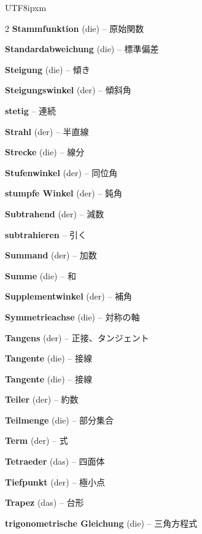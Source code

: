 \begin{CJK}{UTF8}{ipxm}
\begin{multicols}{2}
\textbf{Stammfunktion} (die) -- 原始関数\dotfill\hyperref[e:285]{\pageref*{e:285}}\par
\textbf{Standardabweichung} (die) -- 標準偏差\dotfill\hyperref[e:337]{\pageref*{e:337}}\par
\textbf{Steigung} (die) -- 傾き\dotfill\hyperref[e:120]{\pageref*{e:120}}\par
\textbf{Steigungswinkel} (der) -- 傾斜角\dotfill\hyperref[e:310]{\pageref*{e:310}}\par
\textbf{stetig} -- 連続\dotfill\hyperref[e:268]{\pageref*{e:268}}\par
\textbf{Strahl} (der) -- 半直線\dotfill\hyperref[e:149]{\pageref*{e:149}}\par
\textbf{Strecke} (die) -- 線分\dotfill\hyperref[e:148]{\pageref*{e:148}}\par
\textbf{Stufenwinkel} (der) -- 同位角\dotfill\hyperref[e:167]{\pageref*{e:167}}\par
\textbf{stumpfe Winkel} (der) -- 鈍角\dotfill\hyperref[e:159]{\pageref*{e:159}}\par
\textbf{Subtrahend} (der) -- 減数\dotfill\hyperref[e:20]{\pageref*{e:20}}\par
\textbf{subtrahieren} -- 引く\dotfill\hyperref[e:17]{\pageref*{e:17}}\par
\textbf{Summand} (der) -- 加数\dotfill\hyperref[e:16]{\pageref*{e:16}}\par
\textbf{Summe} (die) -- 和\dotfill\hyperref[e:15]{\pageref*{e:15}}\par
\textbf{Supplementwinkel} (der) -- 補角\dotfill\hyperref[e:165]{\pageref*{e:165}}\par
\textbf{Symmetrieachse} (die) -- 対称の軸\dotfill\hyperref[e:171]{\pageref*{e:171}}\par

\par\nopagebreak
\textbf{Tangens} (der) -- 正接、タンジェント\dotfill\hyperref[e:134]{\pageref*{e:134}}\par
\textbf{Tangente} (die) -- 接線\dotfill\hyperref[e:224]{\pageref*{e:224}}\par
\textbf{Tangente} (die) -- 接線\dotfill\hyperref[e:279]{\pageref*{e:279}}\par
\textbf{Teiler} (der) -- 約数\dotfill\hyperref[e:54]{\pageref*{e:54}}\par
\textbf{Teilmenge} (die) -- 部分集合\dotfill\hyperref[e:98]{\pageref*{e:98}}\par
\textbf{Term} (der) -- 式\dotfill\hyperref[e:72]{\pageref*{e:72}}\par
\textbf{Tetraeder} (das) -- 四面体\dotfill\hyperref[e:234]{\pageref*{e:234}}\par
\textbf{Tiefpunkt} (der) -- 極小点\dotfill\hyperref[e:283]{\pageref*{e:283}}\par
\textbf{Trapez} (das) -- 台形\dotfill\hyperref[e:202]{\pageref*{e:202}}\par
\textbf{trigonometrische Gleichung} (die) -- 三角方程式\dotfill\hyperref[e:86]{\pageref*{e:86}}\par


\end{multicols}
\end{CJK}
